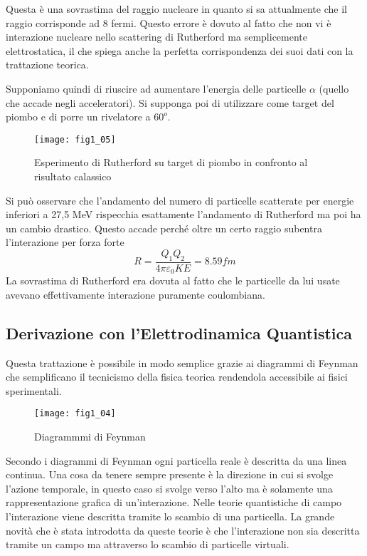Questa è una sovrastima del raggio nucleare in quanto si sa attualmente che il raggio corrisponde ad 8 fermi. 
Questo errore è dovuto al fatto che non vi è interazione nucleare nello scattering di Rutherford ma semplicemente elettrostatica, il che spiega anche la perfetta corrispondenza dei suoi dati con la trattazione teorica.

Supponiamo quindi di riuscire ad aumentare l'energia delle particelle $\alpha$ (quello che accade negli acceleratori). 
Si supponga poi di utilizzare come target del piombo e di porre un rivelatore a $60^o$. 
\begin{figure}[h]
\centering
\texttt{[image: fig1\_05]}
\caption{Esperimento di Rutherford su target di piombo in confronto al risultato calassico}
\end{figure}
Si può osservare che l'andamento del numero di particelle scatterate per energie inferiori a 27,5 MeV rispecchia esattamente l'andamento di Rutherford ma poi ha un cambio drastico. 
Questo accade perché oltre un certo raggio subentra l'interazione per forza forte
\begin{equation}
R=\frac{Q_1Q_2}{4\pi\varepsilon_0KE}=8.59 fm
\end{equation}
La sovrastima di Rutherford era dovuta al fatto che le particelle da lui usate avevano effettivamente interazione puramente coulombiana.


\subsection{Derivazione con l'Elettrodinamica Quantistica}
Questa trattazione è possibile in modo semplice grazie ai diagrammi di Feynman che semplificano il tecnicismo della fisica teorica rendendola accessibile ai fisici sperimentali.
\begin{figure}[h]
\centering
\texttt{[image: fig1\_04]}
\caption{Diagrammmi di Feynman}
\end{figure}
Secondo i diagrammi di Feynman ogni particella reale è descritta da una linea continua. Una cosa da tenere sempre presente è la direzione in cui si svolge l'azione temporale, in questo caso si svolge verso l'alto ma è solamente una rappresentazione grafica di un'interazione.
Nelle teorie quantistiche di campo l'interazione viene descritta tramite lo scambio di una particella.
La grande novità che è stata introdotta da queste teorie è che l'interazione non sia descritta tramite un campo ma attraverso lo scambio di particelle virtuali.

